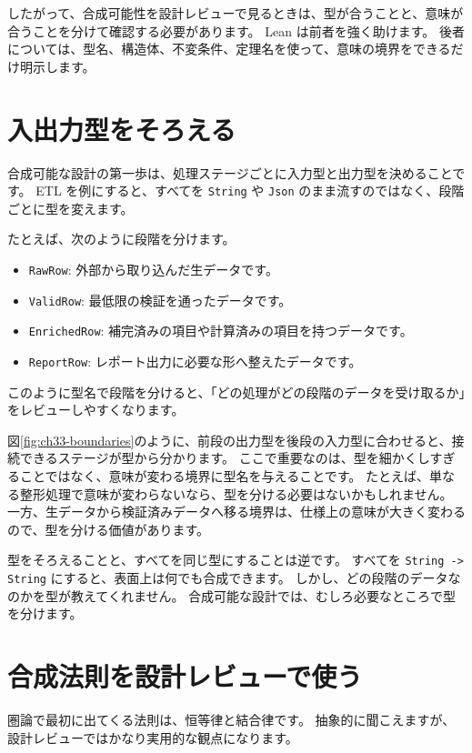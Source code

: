 したがって、合成可能性を設計レビューで見るときは、型が合うことと、意味が合うことを分けて確認する必要があります。
Lean は前者を強く助けます。
後者については、型名、構造体、不変条件、定理名を使って、意味の境界をできるだけ明示します。

\section{入出力型をそろえる}

合成可能な設計の第一歩は、処理ステージごとに入力型と出力型を決めることです。
ETL を例にすると、すべてを \texttt{String} や \texttt{Json} のまま流すのではなく、段階ごとに型を変えます。

たとえば、次のように段階を分けます。
\begin{itemize}
\item \texttt{RawRow}: 外部から取り込んだ生データです。
\item \texttt{ValidRow}: 最低限の検証を通ったデータです。
\item \texttt{EnrichedRow}: 補完済みの項目や計算済みの項目を持つデータです。
\item \texttt{ReportRow}: レポート出力に必要な形へ整えたデータです。
\end{itemize}
このように型名で段階を分けると、「どの処理がどの段階のデータを受け取るか」をレビューしやすくなります。


図\ref{fig:ch33-boundaries}のように、前段の出力型を後段の入力型に合わせると、接続できるステージが型から分かります。
ここで重要なのは、型を細かくしすぎることではなく、意味が変わる境界に型名を与えることです。
たとえば、単なる整形処理で意味が変わらないなら、型を分ける必要はないかもしれません。
一方、生データから検証済みデータへ移る境界は、仕様上の意味が大きく変わるので、型を分ける価値があります。

型をそろえることと、すべてを同じ型にすることは逆です。
すべてを \texttt{String -> String} にすると、表面上は何でも合成できます。
しかし、どの段階のデータなのかを型が教えてくれません。
合成可能な設計では、むしろ必要なところで型を分けます。

\section{合成法則を設計レビューで使う}

圏論で最初に出てくる法則は、恒等律と結合律です。
抽象的に聞こえますが、設計レビューではかなり実用的な観点になります。

